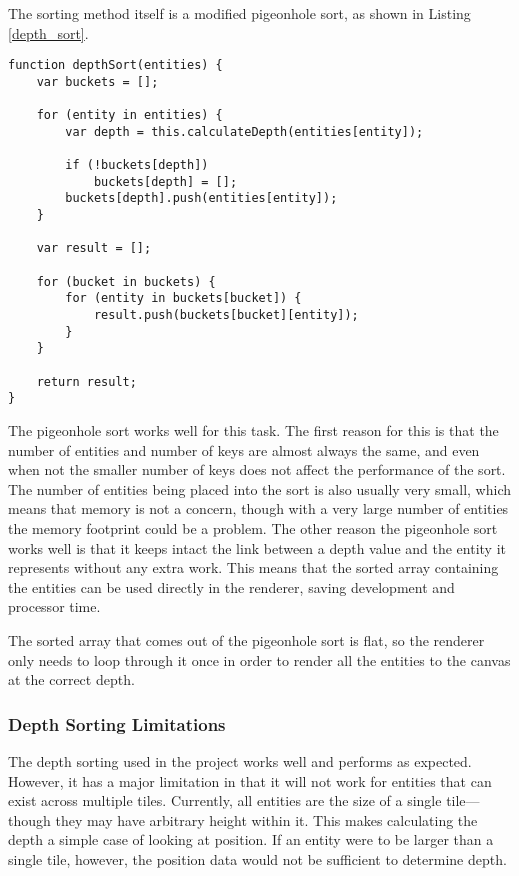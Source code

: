 The sorting method itself is a modified pigeonhole sort, as shown in Listing \ref{depth_sort}.

\noindent
\begin{minipage}{\linewidth}
\begin{lstlisting}[style=js, caption={Depth sorting entities in a scene using a modified pigeonhole sort.}, label=depth_sort]
function depthSort(entities) {
    var buckets = [];

    for (entity in entities) {
        var depth = this.calculateDepth(entities[entity]);

        if (!buckets[depth])
            buckets[depth] = [];
        buckets[depth].push(entities[entity]);
    }

    var result = [];

    for (bucket in buckets) {
        for (entity in buckets[bucket]) {
            result.push(buckets[bucket][entity]);
        }
    }

    return result;
}
\end{lstlisting}
\end{minipage}

The pigeonhole sort works well for this task. The first reason for this is that the number of entities and number of keys are almost always the same, and even when not the smaller number of keys does not affect the performance of the sort. The number of entities being placed into the sort is also usually very small, which means that memory is not a concern, though with a very large number of entities the memory footprint could be a problem. The other reason the pigeonhole sort works well is that it keeps intact the link between a depth value and the entity it represents without any extra work. This means that the sorted array containing the entities can be used directly in the renderer, saving development and processor time.

The sorted array that comes out of the pigeonhole sort is flat, so the renderer only needs to loop through it once in order to render all the entities to the canvas at the correct depth.

\subsubsection{Depth Sorting Limitations}
The depth sorting used in the project works well and performs as expected. However, it has a major limitation in that it will not work for entities that can exist across multiple tiles. Currently, all entities are the size of a single tile---though they may have arbitrary height within it. This makes calculating the depth a simple case of looking at position. If an entity were to be larger than a single tile, however, the position data would not be sufficient to determine depth.


